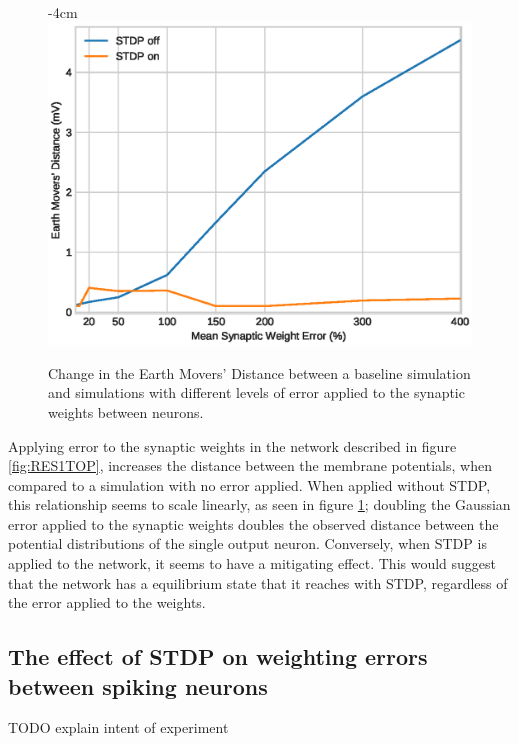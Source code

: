 \begin{figure}[h!]
    \centering
    \addtolength{\leftskip} {-4cm}
    \addtolength{\rightskip}{-4cm}
    \includegraphics[width=0.8\linewidth]{figures/graphs/RESULT1.eps}
    \caption[Increase in EMD from inserting error in network synaptic weights]{Change in the Earth Movers' Distance between a baseline simulation and simulations with different levels of error applied to the synaptic weights between neurons.}
    \label{fig:RES1}
\end{figure}

\FloatBarrier

Applying error to the synaptic weights in the network described in figure
\ref{fig:RES1TOP}, increases the distance between the membrane potentials, when
compared to a simulation with no error applied. When applied without STDP, this
relationship seems to scale linearly, as seen in figure \ref{fig:RES1}; doubling
the Gaussian error applied to the synaptic weights doubles the observed distance
between the potential distributions of the single output neuron. Conversely,
when STDP is applied to the network, it seems to have a mitigating effect. This
would suggest that the network has a equilibrium state that it reaches with
STDP, regardless of the error applied to the weights.

\subsection{The effect of STDP on weighting errors between spiking neurons}

TODO explain intent of experiment

